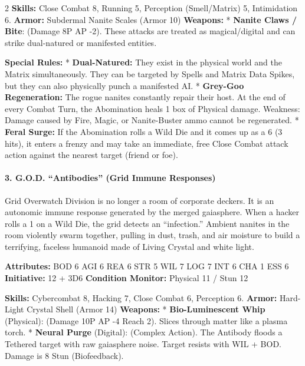 \documentclass[
  oneside]{article}
\begin{document}
\begin{multicols}{2}
\textbf{Skills:} Close Combat 8, Running 5,
Perception (Smell/Matrix) 5, Intimidation 6.
\textbf{Armor:} Subdermal Nanite Scales (Armor 10)
\textbf{Weapons:} * \textbf{Nanite Claws / Bite}:
(Damage 8P \textbar{} AP -2). These attacks are
treated as magical/digital and can strike
dual-natured or manifested entities.

\textbf{Special Rules:} * \textbf{Dual-Natured:}
They exist in the physical world and the Matrix
simultaneously. They can be targeted by Spells and
Matrix Data Spikes, but they can also physically
punch a manifested AI. * \textbf{Grey-Goo
Regeneration:} The rogue nanites constantly repair
their host. At the end of every Combat Turn, the
Abomination heals 1 box of Physical damage.
Weakness: Damage caused by Fire, Magic, or
Nanite-Buster ammo cannot be regenerated. *
\textbf{Feral Surge:} If the Abomination rolls a
Wild Die and it comes up as a 6 (3 hits), it
enters a frenzy and may take an immediate, free
Close Combat attack action against the nearest
target (friend or foe).

\hypertarget{g.o.d.-antibodies-grid-immune-responses}{%
\paragraph{3. G.O.D. ``Antibodies'' (Grid Immune
Responses)}\label{g.o.d.-antibodies-grid-immune-responses}}

Grid Overwatch Division is no longer a room of
corporate deckers. It is an autonomic immune
response generated by the merged gaiasphere. When
a hacker rolls a 1 on a Wild Die, the grid detects
an ``infection.'' Ambient nanites in the room
violently swarm together, pulling in dust, trash,
and air moisture to build a terrifying, faceless
humanoid made of Living Crystal and white light.

\textbf{Attributes:} BOD 6 \textbar{} AGI 6
\textbar{} REA 6 \textbar{} STR 5 \textbar{} WIL 7
\textbar{} LOG 7 \textbar{} INT 6 \textbar{} CHA 1
\textbar{} ESS 6 \textbf{Initiative:} 12 + 3D6
\textbf{Condition Monitor:} Physical 11 / Stun 12

\textbf{Skills:} Cybercombat 8, Hacking 7, Close
Combat 6, Perception 6. \textbf{Armor:} Hard-Light
Crystal Shell (Armor 14) \textbf{Weapons:} *
\textbf{Bio-Luminescent Whip} (Physical): (Damage
10P \textbar{} AP -4 \textbar{} Reach 2). Slices
through matter like a plasma torch. *
\textbf{Neural Purge} (Digital): (Complex Action).
The Antibody floods a Tethered target with raw
gaiasphere noise. Target resists with WIL + BOD.
Damage is 8 Stun (Biofeedback).


\end{multicols}
\end{document}
